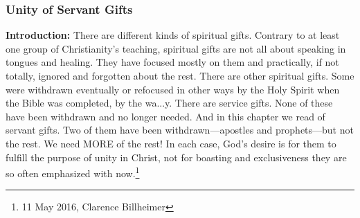 \subsubsection{Unity of Servant Gifts}
\textbf{Introduction:} There are different kinds of spiritual gifts. Contrary to at least one group of Christianity’s teaching, spiritual gifts are not all about speaking in tongues and healing. They have focused mostly on them and practically, if not totally, ignored and forgotten about the rest. There are other spiritual gifts. Some were withdrawn eventually or refocused in other ways by the Holy Spirit when the Bible was completed, by the wa...y. There are service gifts. None of these have been withdrawn and no longer needed. And in this chapter we read of servant gifts. Two of them have been withdrawn—apostles and prophets—but not the rest. We need MORE of the rest! In each case, God’s desire is for them to fulfill the purpose of unity in Christ, not for boasting and exclusiveness they are so often emphasized with now.\footnote{11 May 2016, Clarence Billheimer}
